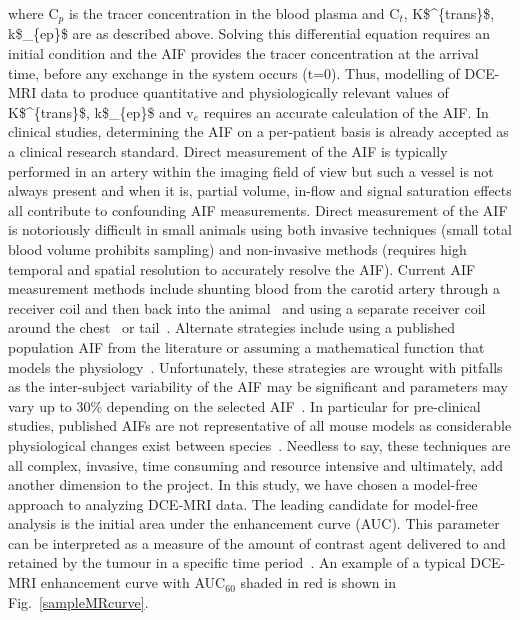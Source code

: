 where C$_p$ is the tracer concentration in the blood plasma and C$_t$, \acs{K$^{trans}$}, \acs{k$_{ep}$} are as described above. 
Solving this differential equation requires an initial condition and the \acs{AIF} provides the tracer concentration at the arrival time, before any exchange in the system occurs (t=0). 
Thus, modelling of \acs{DCE-MRI} data to produce quantitative and physiologically relevant values of \acs{K$^{trans}$}, \acs{k$_{ep}$} and v$_e$ requires an accurate calculation of the \acs{AIF}. 
In clinical studies, determining the \acs{AIF} on a per-patient basis is already accepted as a clinical research standard. 
Direct measurement of the \acs{AIF} is typically performed in an artery within the imaging field of view but such a vessel is not always present and when it is, partial volume, in-flow and signal saturation effects all contribute to confounding \acs{AIF} measurements. 
Direct measurement of the \acs{AIF} is notoriously difficult in small animals using both invasive techniques (small total blood volume prohibits sampling) and non-invasive methods (requires high temporal and spatial resolution to accurately resolve the \acs{AIF}). 
Current \acs{AIF} measurement methods include shunting blood from the carotid artery through a receiver coil and then back into the animal~\cite{Simpson:1999vl} and using a separate receiver coil around the chest~\cite{Pickup:2009ce} or tail~\cite{McIntyre:2004eh}. 
Alternate strategies include using a published population \acs{AIF} from the literature or assuming a mathematical function that models the physiology~\cite{Yankeelov:2006dr}. 
Unfortunately, these strategies are wrought with pitfalls as the inter-subject variability of the \acs{AIF} may be significant and parameters may vary up to 30\% depending on the selected \acs{AIF}~\cite{Simpson:1999vg}. 
In particular for pre-clinical studies, published \acs{AIF}s are not representative of all mouse models as considerable physiological changes exist between species~\cite{Simpson:1999vg}. 
Needless to say, these techniques are all complex, invasive, time consuming and resource intensive and ultimately, add another dimension to the project. 
In this study, we have chosen a model-free approach to analyzing \acs{DCE-MRI} data. 
The leading candidate for model-free analysis is the initial area under the enhancement curve (\acs{AUC}). 
This parameter can be interpreted as a measure of the amount of contrast agent delivered to and retained by the tumour in a specific time period~\cite{Baert:2011uc}. 
An example of a typical \acs{DCE-MRI} enhancement curve with \acs{AUC}$_{60}$ shaded in red is shown in Fig.~\ref{sampleMRcurve}.

